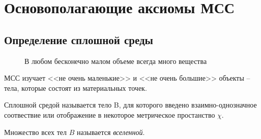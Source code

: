 \section{Основополагающие аксиомы МСС}

\subsection{Определение сплошной среды}

\begin{figure}[H]
	\centering
	\begin{minipage}{0.3\linewidth}
		\centering
		
	\end{minipage} 
	\hspace{25mm}
	\begin{minipage}{0.3\linewidth}
		\centering
		
		\caption{В любом бесконечно малом объеме всегда много вещества}
	\end{minipage}	
\end{figure}

%	

МСС изучает <<не очень маленькие>> и <<не очень большие>> объекты -- тела, которые состоят
из материальных точек.

%  

\begin{figure}[H]
	\centering
	
\end{figure}

\begin{definition}
  Сплошной средой называется тело B, для которого введено взаимно-однозначное соотвествие
  или отображение в некоторое метрическое простанство $\chi$.
\end{definition}

\begin{definition}
  Множество всех тел $B$ называется \emph{вселенной}.
\end{definition}

%	


